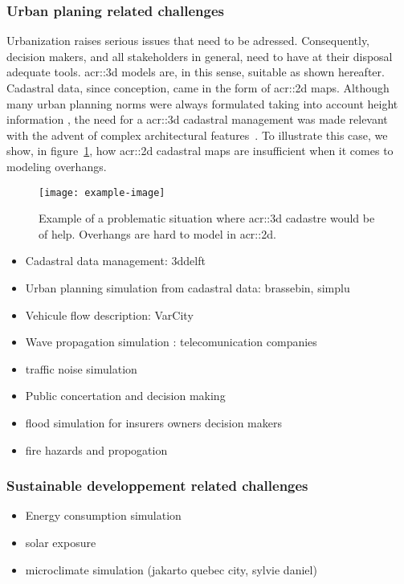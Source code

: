         \subsubsection{Urban planing related challenges}
        Urbanization raises serious issues that need to be adressed.
        Consequently, decision makers, and all stakeholders in general, need to have at their disposal adequate tools.
        \gls{acr::3d} models are, in this sense, suitable as shown hereafter.\\

        Cadastral data, since conception, came in the form of \gls{acr::2d} maps\addref.
        Although many urban planning norms were always formulated taking into account height information \addref, the need for a \gls{acr::3d} cadastral management was made relevant with the advent of complex architectural features~\cite{ijgi4042842}.
        To illustrate this case, we show, in figure~\ref{fig::3d_cadastre_need_example}, how \gls{acr::2d} cadastral maps are insufficient when it comes to modeling overhangs.
        \begin{figure}[h]
            \centering
            \texttt{[image: example-image]}             
            \caption{\label{fig::3d_cadastre_need_example} Example of a problematic situation where \gls{acr::3d} cadastre would be of help. Overhangs are hard to model in \gls{acr::2d}.}
        \end{figure}
        \begin{itemize}
            \item Cadastral data management: 3ddelft
            \item Urban planning simulation from cadastral data: brassebin, simplu
            \item Vehicule flow description: VarCity
            \item Wave propagation simulation : telecomunication companies
            \item traffic noise simulation
            \item Public concertation and decision making
            \item flood simulation for insurers owners decision makers
            \item fire hazards and propogation
        \end{itemize}
        \subsubsection{Sustainable developpement related challenges}
        \begin{itemize}
            \item Energy consumption simulation
            \item solar exposure
            \item microclimate simulation (jakarto quebec city, sylvie daniel)
        \end{itemize}
